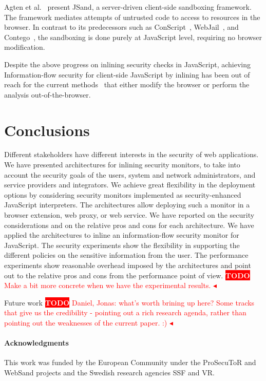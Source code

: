 \documentclass{llncs}
\newcommand{\todo}[1]{\colorbox{red}{\textcolor{white}{\sffamily\bfseries\scriptsize TODO}} \textcolor{red}{#1} \textcolor{red}{$\blacktriangleleft$}}
\begin{document}
Agten et al.~\cite{DBLP:conf/acsac/AgtenABPDP12} present JSand, a
server-driven client-side sandboxing framework. The framework mediates
attempts of untrusted code to access to resources in the browser.  
In contrast to its predecessors such as
ConScript~\cite{DBLP:conf/sp/MeyerovichL10}, WebJail~\cite{DBLP:conf/acsac/AckerRDPJ11}, and Contego~\cite{DBLP:conf/trust/LuoD11},
the sandboxing is done purely at JavaScript level, requiring no
browser modification.

Despite the above progress on inlining security checks in JavaScript, achieving
Information-flow security for client-side JavaScript by inlining has been out of
reach for the current methods~\cite{Vogt+:NDSS07,DBLP:conf/pldi/ChughMJL09,Yip:Narula:Krohn:Morris:EUROSYS09,Jang+:CCS10,DeGroef+:CCS12}  that either
modify the browser or perform the analysis out-of-the-browser.

\section{Conclusions}
\label{sec:conc}
Different stakeholders have different interests in the security of web
applications. We have presented architectures for inlining security
monitors, to take into account the security goals of the users, system and
network administrators, and service providers and integrators.
%
We achieve great flexibility in the deployment options by considering
security monitors implemented as security-enhanced JavaScript interpreters.
%
The architectures allow deploying such a monitor in a browser
extension, web proxy, or web service.
%
We have reported on the security considerations and on the relative pros and
cons for each architecture.
%
We have applied the architectures to inline an information-flow
security monitor for JavaScript.
%
The security experiments show the
flexibility in supporting the different policies on the sensitive
information from the user. 
%
The performance experiments show reasonable overhead imposed by the
architectures and point out to the relative pros and cons from the
performance point of view. \todo{Make a bit more concrete when we have
the experimental results.}

Future work \todo{Daniel, Jonas: what's worth brining up here? Some
tracks that give us the credibility - pointing out a rich research agenda, rather
than pointing out the weaknesses of the current paper. :) }

\paragraph{Acknowledgments}
This work was funded by 
the European Community under the ProSecuToR and WebSand projects
and
the Swedish research agencies SSF and VR.




\end{document}
